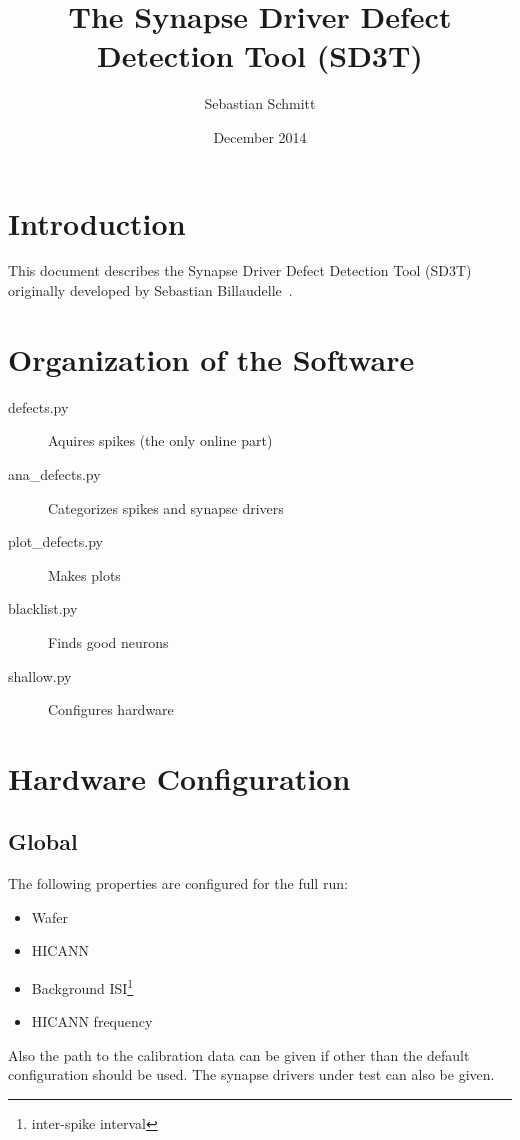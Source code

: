 \documentclass[a4paper]{article}
\title{The Synapse Driver Defect Detection Tool (SD3T)}
\author{Sebastian Schmitt}
\date{December 2014}
\begin{document}
\maketitle

\tableofcontents

\section{Introduction}

This document describes the Synapse Driver Defect Detection Tool (SD3T)
originally developed by Sebastian Billaudelle~\cite{bachelor:SB}.

\section{Organization of the Software}

\begin{description}
  \item[defects.py] Aquires spikes (the only online part)
  \item[ana\_defects.py] Categorizes spikes and synapse drivers
  \item[plot\_defects.py] Makes plots
  \item[blacklist.py] Finds good neurons
  \item[shallow.py] Configures hardware
\end{description}

\section{Hardware Configuration}

\subsection{Global}

The following properties are configured for the full run:

\begin{itemize}
\item Wafer
\item HICANN
\item Background ISI\footnote{inter-spike interval}
\item HICANN frequency
\end{itemize}

Also the path to the calibration data can be given if other than the
default configuration should be used. The synapse drivers under test
can also be given.
\end{document}
